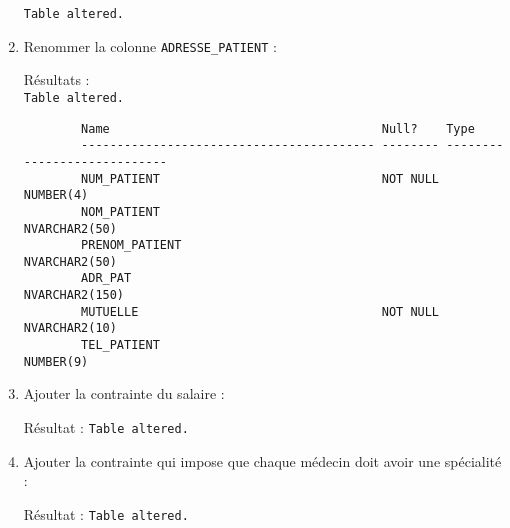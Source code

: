 \documentclass[12pt,a4paper]{article}
\begin{document}
\begin{enumerate}
\begin{verbatim}
		\end{verbatim}
		\texttt{Table altered.}
		\item Renommer la colonne \texttt{ADRESSE\_PATIENT} :
		
		Résultats :\\
		\texttt{Table altered.}
		\begin{verbatim}
		Name                                      Null?    Type
		----------------------------------------- -------- ----------------------------
		NUM_PATIENT                               NOT NULL NUMBER(4)
		NOM_PATIENT                                        NVARCHAR2(50)
		PRENOM_PATIENT                                     NVARCHAR2(50)
		ADR_PAT                                            NVARCHAR2(150)
		MUTUELLE                                  NOT NULL NVARCHAR2(10)
		TEL_PATIENT                                        NUMBER(9)
		\end{verbatim}
		\item Ajouter la contrainte du salaire :
		
		Résultat : \texttt{Table altered.}
		\item Ajouter la contrainte qui impose que chaque médecin doit avoir une spécialité :
		
		Résultat : \texttt{Table altered.}
	\end{enumerate}
	\vspace{1em}
\end{document}

